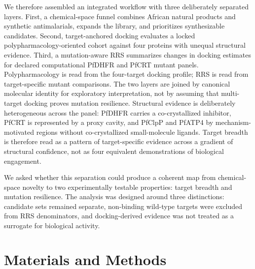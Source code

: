 \documentclass[journal=jcisd8,manuscript=article]{achemso}
\begin{document}
We therefore assembled an integrated workflow with three deliberately separated layers. First, a chemical-space funnel combines African natural products and synthetic antimalarials, expands the library, and prioritizes synthesizable candidates. Second, target-anchored docking evaluates a locked polypharmacology-oriented cohort against four proteins with unequal structural evidence. Third, a mutation-aware RRS summarizes changes in docking estimates for declared computational PfDHFR and PfCRT mutant panels. Polypharmacology is read from the four-target docking profile; RRS is read from target-specific mutant comparisons. The two layers are joined by canonical molecular identity for exploratory interpretation, not by assuming that multi-target docking proves mutation resilience. Structural evidence is deliberately heterogeneous across the panel: PfDHFR carries a co-crystallized inhibitor, PfCRT is represented by a proxy cavity, and PfClpP and PfATP4 by mechanism-motivated regions without co-crystallized small-molecule ligands. Target breadth is therefore read as a pattern of target-specific evidence across a gradient of structural confidence, not as four equivalent demonstrations of biological engagement.

We asked whether this separation could produce a coherent map from chemical-space novelty to two experimentally testable properties: target breadth and mutation resilience. The analysis was designed around three distinctions: candidate sets remained separate, non-binding wild-type targets were excluded from RRS denominators, and docking-derived evidence was not treated as a surrogate for biological activity.

\section{Materials and Methods}\label{sec:methods}
\end{document}
